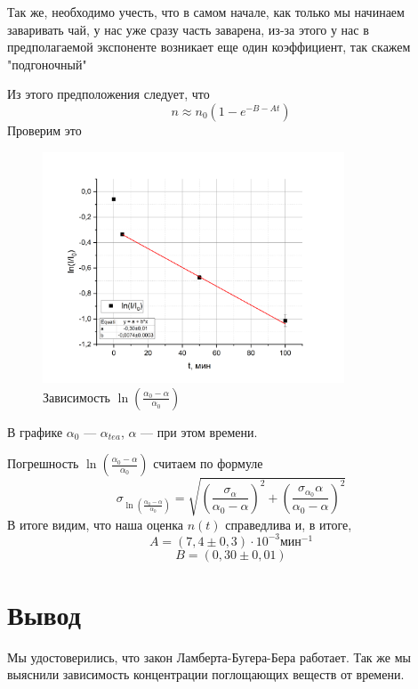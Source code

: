 \documentclass[a4paper, 12pt]{article}%
\begin{document}
Так же, необходимо учесть, что в самом начале, как только мы начинаем заваривать чай, у нас уже сразу часть заварена, из-за этого у нас в предполагаемой экспоненте возникает еще один коэффициент, так скажем "подгоночный"

Из этого предположения следует, что 
\[n \approx n_0 \left(1-e^{-B-At}\right)\]
Проверим это 
\begin{figure}[h]
\begin{center}
\includegraphics[width = 0.8\textwidth]{7.jpg}
\caption{Зависимость $\ln\left(\frac{\alpha_0-\alpha}{\alpha_0}\right)$}
\end{center}
\end{figure}

В графике $\alpha_0$ --- $\alpha_{tea}$, $\alpha$ --- при этом времени.

 Погрешность $\ln\left(\frac{\alpha_0-\alpha}{\alpha_0}\right)$ считаем по формуле
\[\sigma_{\ln\left(\frac{\alpha_0-\alpha}{\alpha_0}\right)} = \sqrt{\left(\frac{\sigma_{\alpha}}{\alpha_0-\alpha}\right)^2+\left(\frac{\sigma_{\alpha_0} \alpha}{\alpha_0-\alpha}\right)^2}\]
В итоге видим, что наша оценка $n(t)$ справедлива и, в итоге,
\[A = (7,4 \pm 0,3) \cdot 10^{-3} \text{мин}^{-1}\]
\[B = (0,30 \pm 0,01)\]
\section*{Вывод}
Мы удостоверились, что закон Ламберта-Бугера-Бера работает. Так же мы выяснили зависимость концентрации поглощающих веществ от времени.
\end{document}
